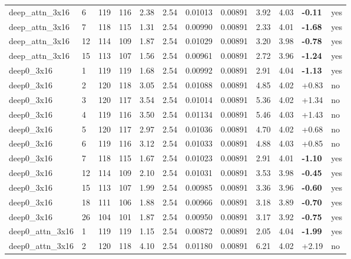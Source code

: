 \documentclass[10pt,a4paper]{article}
\begin{document}
\begin{landscape}
\begin{footnotesize}
\begin{longtable}{llllllllllll}
deep\_attn\_3x16 & 6 & 119 & 116 & 2.38 & 2.54 & 0.01013 & 0.00891 & 3.92 & 4.03 & \textbf{-0.11} & yes \\
deep\_attn\_3x16 & 7 & 118 & 115 & 1.31 & 2.54 & 0.00990 & 0.00891 & 2.33 & 4.01 & \textbf{-1.68} & yes \\
deep\_attn\_3x16 & 12 & 114 & 109 & 1.87 & 2.54 & 0.01029 & 0.00891 & 3.20 & 3.98 & \textbf{-0.78} & yes \\
deep\_attn\_3x16 & 15 & 113 & 107 & 1.56 & 2.54 & 0.00961 & 0.00891 & 2.72 & 3.96 & \textbf{-1.24} & yes \\
deep0\_3x16 & 1 & 119 & 119 & 1.68 & 2.54 & 0.00992 & 0.00891 & 2.91 & 4.04 & \textbf{-1.13} & yes \\
deep0\_3x16 & 2 & 120 & 118 & 3.05 & 2.54 & 0.01088 & 0.00891 & 4.85 & 4.02 & +0.83 & no \\
deep0\_3x16 & 3 & 120 & 117 & 3.54 & 2.54 & 0.01014 & 0.00891 & 5.36 & 4.02 & +1.34 & no \\
deep0\_3x16 & 4 & 119 & 116 & 3.50 & 2.54 & 0.01134 & 0.00891 & 5.46 & 4.03 & +1.43 & no \\
deep0\_3x16 & 5 & 120 & 117 & 2.97 & 2.54 & 0.01036 & 0.00891 & 4.70 & 4.02 & +0.68 & no \\
deep0\_3x16 & 6 & 119 & 116 & 3.12 & 2.54 & 0.01033 & 0.00891 & 4.88 & 4.03 & +0.85 & no \\
deep0\_3x16 & 7 & 118 & 115 & 1.67 & 2.54 & 0.01023 & 0.00891 & 2.91 & 4.01 & \textbf{-1.10} & yes \\
deep0\_3x16 & 12 & 114 & 109 & 2.10 & 2.54 & 0.01031 & 0.00891 & 3.53 & 3.98 & \textbf{-0.45} & yes \\
deep0\_3x16 & 15 & 113 & 107 & 1.99 & 2.54 & 0.00985 & 0.00891 & 3.36 & 3.96 & \textbf{-0.60} & yes \\
deep0\_3x16 & 18 & 111 & 106 & 1.88 & 2.54 & 0.00966 & 0.00891 & 3.18 & 3.89 & \textbf{-0.70} & yes \\
deep0\_3x16 & 26 & 104 & 101 & 1.87 & 2.54 & 0.00950 & 0.00891 & 3.17 & 3.92 & \textbf{-0.75} & yes \\
deep0\_attn\_3x16 & 1 & 119 & 119 & 1.15 & 2.54 & 0.00872 & 0.00891 & 2.05 & 4.04 & \textbf{-1.99} & yes \\
deep0\_attn\_3x16 & 2 & 120 & 118 & 4.10 & 2.54 & 0.01180 & 0.00891 & 6.21 & 4.02 & +2.19 & no \\
\bottomrule \end{longtable}
\end{footnotesize}
\end{landscape}
\end{document}
